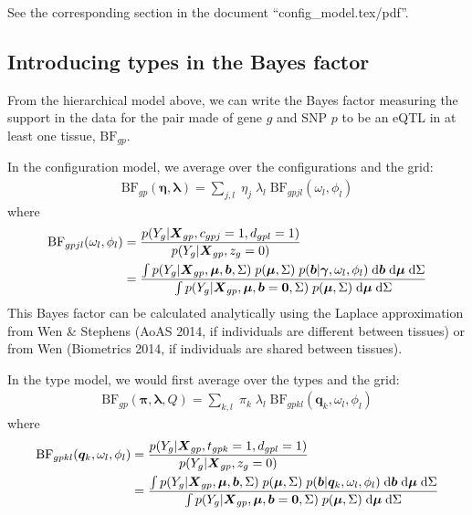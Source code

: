 \documentclass[10pt]{article}
\newcommand{\BF}{{\text{BF}}} %
\newcommand{\der}{{\text{d}}} %
\newcommand{\Xv}{\mbox{\boldmath$X$}}
\begin{document}
See the corresponding section in the document ``config\_model.tex/pdf''.


\subsection{Introducing types in the Bayes factor}

From the hierarchical model above, we can write the Bayes factor measuring the support in the data for the pair made of gene $g$ and SNP $p$ to be an eQTL in at least one tissue, $\BF_{gp}$.

In the configuration model, we average over the configurations and the grid:
\begin{equation}
  \begin{aligned}
    \BF_{gp}(\bm{\eta}, \bm{\lambda}) = \sum_{j,l} \; \eta_j \; \lambda_l \; \BF_{gpjl}(\omega_l,\phi_l)
  \end{aligned}
\end{equation}
where
\begin{equation}
  \begin{aligned}
    \BF_{gpjl}(\omega_l,\phi_l) &= \frac{p(Y_g | \Xv_{gp}, c_{gpj}=1, d_{gpl}=1)}{p(Y_g | \Xv_{gp}, z_g=0)} \\
    &= \frac{\int p(Y_g | \Xv_{gp}, \bm{\mu}, \bm{b}, \Sigma) \; p(\bm{\mu},\Sigma) \; p(\bm{b} | \bm{\gamma}, \omega_l, \phi_l) \; \der \bm{b} \; \der \bm{\mu} \; \der \Sigma}{\int p(Y_g | \Xv_{gp}, \bm{\mu}, \bm{b}=\bm{0}, \Sigma) \; p(\bm{\mu},\Sigma) \; \der \bm{\mu} \; \der \Sigma}
  \end{aligned}
\end{equation}
This Bayes factor can be calculated analytically using the Laplace approximation from Wen \& Stephens (AoAS 2014, if individuals are different between tissues) or from Wen (Biometrics 2014, if individuals are shared between tissues).

\bigskip

In the type model, we would first average over the types and the grid:
\begin{equation}
  \begin{aligned}
    \BF_{gp}(\bm{\pi}, \bm{\lambda}, Q) = \sum_{k,l} \; \pi_k \; \lambda_l \; \BF_{gpkl}(\bm{q}_k,\omega_l,\phi_l)
  \end{aligned}
\end{equation}
where
\begin{equation}
  \label{bf_gpkl}
  \begin{aligned}
    \BF_{gpkl}(\bm{q}_k,\omega_l,\phi_l) &= \frac{p(Y_g | \Xv_{gp}, t_{gpk}=1, d_{gpl}=1)}{p(Y_g | \Xv_{gp}, z_g=0)} \\
    &= \frac{\int p(Y_g | \Xv_{gp}, \bm{\mu}, \bm{b}, \Sigma) \; p(\bm{\mu},\Sigma) \; p(\bm{b} | \bm{q}_k, \omega_l, \phi_l) \; \der \bm{b} \; \der \bm{\mu} \; \der \Sigma}{\int p(Y_g | \Xv_{gp}, \bm{\mu}, \bm{b}=\bm{0}, \Sigma) \; p(\bm{\mu},\Sigma) \; \der \bm{\mu} \; \der \Sigma}
  \end{aligned}
\end{equation}
\end{document}
